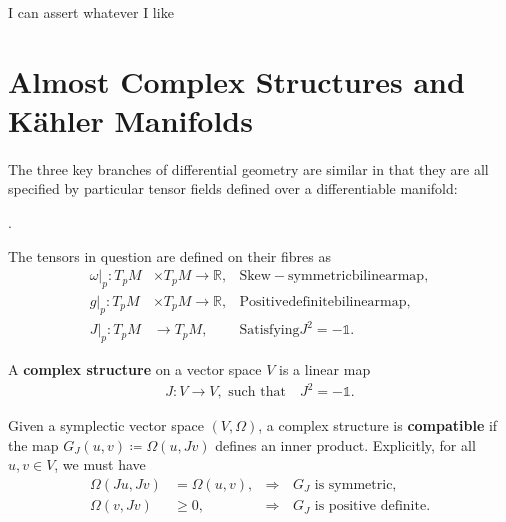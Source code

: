 \documentclass[11pt, final]{article}
\begin{document}
\begin{lemma}\label{lem:Weinstein2}
	I can assert whatever I like
\end{lemma}

\section{Almost Complex Structures and K\"ahler Manifolds}

\paragraph{} The three key branches of differential geometry are similar in that they are all specified by particular tensor fields defined over a differentiable manifold:
	\begin{center}
		.
	\end{center}
	The tensors in question are defined on their fibres as
		\begin{align*}
			\omega|_p :T_pM &\times T_pM \to \mathbb{R}, & \mathrm{Skew-symmetric bilinear map},\\
			g|_p: T_pM &\times T_pM \to \mathbb{R}, & \mathrm{Positive definite bilinear map}, \\
			J|_p: T_pM &\to T_pM, & \mathrm{Satisfying } J^2 = -\mathds{1}.
		\end{align*}
		
\begin{definition}
	A \textbf{complex structure} on a vector space $V$ is a linear map
		\begin{align}
			J: V \to V, \text{ such that} \quad J^2 = - \mathds{1}.
		\end{align}	
\end{definition}

\begin{definition}\label{def:compatibility}
	Given a symplectic vector space $(V,\Omega)$, a complex structure is \textbf{compatible} if the map $G_J(u,v) \coloneqq \Omega(u,Jv)$ defines an inner product. Explicitly, for all $u,v \in V$, we must have
		\begin{align*}
			\Omega(Ju,Jv) &= \Omega(u,v),  &\Rightarrow& \, G_J \text{ is symmetric},\\
			\Omega(v,Jv) &\geq 0,  &\Rightarrow& \, G_J \text{ is positive definite}.
		\end{align*}
\end{definition}
\end{document}

